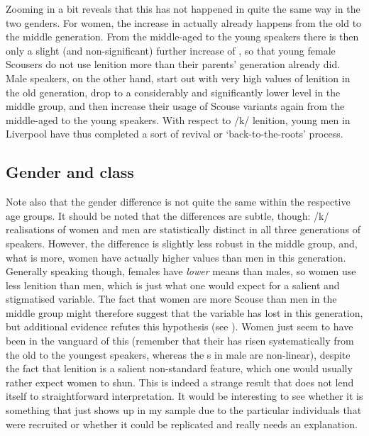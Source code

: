 Zooming in a bit reveals that this  has not happened in quite the same way in the two genders.
For women, the increase in  actually already happens from the old to the middle generation.
From the middle-aged to the young speakers there is then only a slight (and non-significant) further increase of , so that young female Scousers do not use lenition more than their parents' generation already did.
Male speakers, on the other hand, start out with very high values of lenition in the old generation, drop to a considerably and significantly lower level in the middle group, and then increase their usage of Scouse variants again from the middle-aged to the young speakers.
With respect to /k/ lenition, young men in Liverpool have thus completed a sort of revival or `back-to-the-roots' process.

\subsection{Gender and class}
\label{prod.disc.k.social}

Note also that the gender difference is not quite the same within the respective age groups.
It should be noted that the differences are subtle, though: /k/ realisations of women and men are statistically distinct in all three generations of speakers.
However, the difference is slightly less robust in the middle group, and, what is more, women have actually higher  values than men in this generation.
Generally speaking though, females have \emph{lower}  means than males, so women use less lenition than men, which is just what one would expect for a salient and stigmatised variable.
The fact that women are more Scouse than men in the middle group might therefore suggest that the variable has lost  in this generation, but additional evidence refutes this hypothesis (see ).
Women just seem to have been in the vanguard of this  (remember that their  has risen systematically from the old to the youngest speakers, whereas the s in male  are non-linear), despite the fact that lenition is a salient non-standard feature, which one would usually rather expect women to shun.
This is indeed a strange result that does not lend itself to straightforward interpretation.
It would be interesting to see whether it is something that just shows up in my sample due to the particular individuals that were recruited or whether it could be replicated and really needs an explanation.

